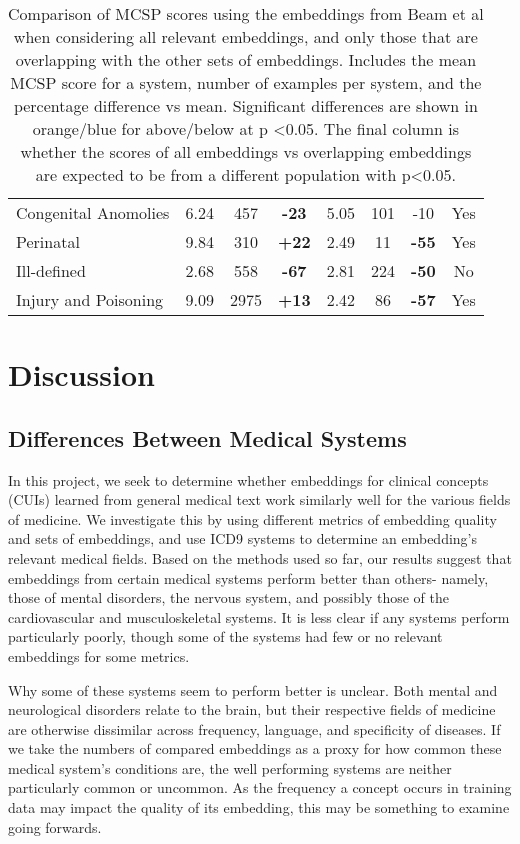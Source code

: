 \documentclass[11pt,a4paper]{article}
\def\blu#1{{\textbf{\color{blu}#1}}}
\def\ora#1{{\textbf{\color{ora}#1}}}
\begin{document}
\begin{table*}[h]
\begin{tabular}{l|c|c|c|c|c|c|c}
		Congenital Anomolies & 6.24  & 457      & \blu{-23}       & 5.05 & 101      & -10             & Yes        \\
		Perinatal            & 9.84  & 310      & \ora{+22}        & 2.49 & 11       & \blu{-55}       & Yes        \\
		Ill-defined          & 2.68  & 558      & \blu{-67}       & 2.81 & 224      & \blu{-50}       & No         \\
		Injury and Poisoning & 9.09  & 2975     & \ora{+13}        & 2.42 & 86       & \blu{-57}       & Yes             
	\end{tabular}
\caption{Comparison of MCSP scores using the embeddings from Beam et al when considering all relevant embeddings, and only those that are overlapping with the other sets of embeddings. Includes the mean MCSP score for a system, number of examples per system, and the percentage difference vs mean. Significant differences are shown in orange/blue for above/below at p \textless 0.05. The final column is whether the scores of all embeddings vs overlapping embeddings are expected to be from a different population with p\textless 0.05.}
\end{table*}

\section{Discussion}

\subsection{Differences Between Medical Systems}
In this project, we seek to determine whether embeddings for clinical concepts (CUIs) learned from general medical text work similarly well for the various fields of medicine. We investigate this by using different metrics of embedding quality and sets of embeddings, and use ICD9 systems to determine an embedding's relevant medical fields. Based on the methods used so far, our results suggest that embeddings from certain medical systems perform better than others- namely, those of mental disorders, the nervous system, and possibly those of the cardiovascular and musculoskeletal systems. It is less clear if any systems perform particularly poorly, though some of the systems had few or no relevant embeddings for some metrics. 

Why some of these systems seem to perform better is unclear. Both mental and neurological disorders relate to the brain, but their respective fields of medicine are otherwise dissimilar across frequency, language, and specificity of diseases.  If we take the numbers of compared embeddings as a proxy for how common these medical system's conditions are, the well performing systems are neither particularly common or uncommon. As the frequency a concept occurs in training data may impact the quality of its embedding, this may be something to examine going forwards. 
\end{document}
